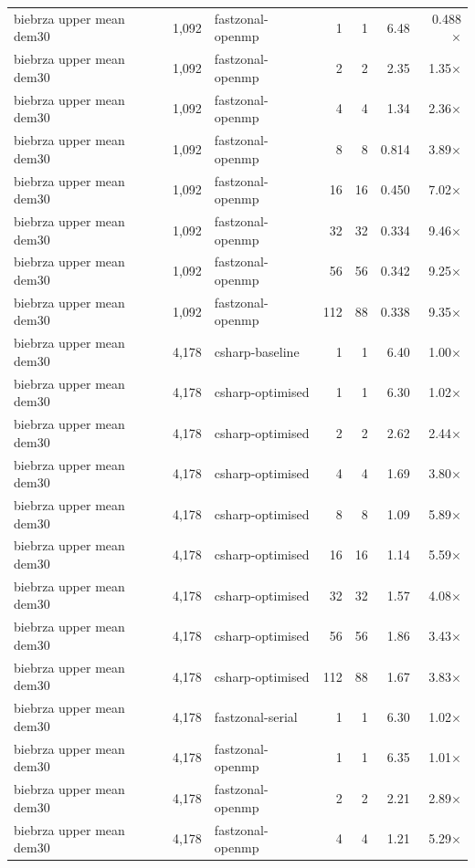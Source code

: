 \begin{tabular}{lrlrrrr}
biebrza upper mean dem30 & 1,092 & fastzonal-openmp & 1 & 1 & 6.48 & 0.488$\times$ \\
biebrza upper mean dem30 & 1,092 & fastzonal-openmp & 2 & 2 & 2.35 & 1.35$\times$ \\
biebrza upper mean dem30 & 1,092 & fastzonal-openmp & 4 & 4 & 1.34 & 2.36$\times$ \\
biebrza upper mean dem30 & 1,092 & fastzonal-openmp & 8 & 8 & 0.814 & 3.89$\times$ \\
biebrza upper mean dem30 & 1,092 & fastzonal-openmp & 16 & 16 & 0.450 & 7.02$\times$ \\
biebrza upper mean dem30 & 1,092 & fastzonal-openmp & 32 & 32 & 0.334 & 9.46$\times$ \\
biebrza upper mean dem30 & 1,092 & fastzonal-openmp & 56 & 56 & 0.342 & 9.25$\times$ \\
biebrza upper mean dem30 & 1,092 & fastzonal-openmp & 112 & 88 & 0.338 & 9.35$\times$ \\
biebrza upper mean dem30 & 4,178 & csharp-baseline & 1 & 1 & 6.40 & 1.00$\times$ \\
biebrza upper mean dem30 & 4,178 & csharp-optimised & 1 & 1 & 6.30 & 1.02$\times$ \\
biebrza upper mean dem30 & 4,178 & csharp-optimised & 2 & 2 & 2.62 & 2.44$\times$ \\
biebrza upper mean dem30 & 4,178 & csharp-optimised & 4 & 4 & 1.69 & 3.80$\times$ \\
biebrza upper mean dem30 & 4,178 & csharp-optimised & 8 & 8 & 1.09 & 5.89$\times$ \\
biebrza upper mean dem30 & 4,178 & csharp-optimised & 16 & 16 & 1.14 & 5.59$\times$ \\
biebrza upper mean dem30 & 4,178 & csharp-optimised & 32 & 32 & 1.57 & 4.08$\times$ \\
biebrza upper mean dem30 & 4,178 & csharp-optimised & 56 & 56 & 1.86 & 3.43$\times$ \\
biebrza upper mean dem30 & 4,178 & csharp-optimised & 112 & 88 & 1.67 & 3.83$\times$ \\
biebrza upper mean dem30 & 4,178 & fastzonal-serial & 1 & 1 & 6.30 & 1.02$\times$ \\
biebrza upper mean dem30 & 4,178 & fastzonal-openmp & 1 & 1 & 6.35 & 1.01$\times$ \\
biebrza upper mean dem30 & 4,178 & fastzonal-openmp & 2 & 2 & 2.21 & 2.89$\times$ \\
biebrza upper mean dem30 & 4,178 & fastzonal-openmp & 4 & 4 & 1.21 & 5.29$\times$ \\

\end{tabular}
